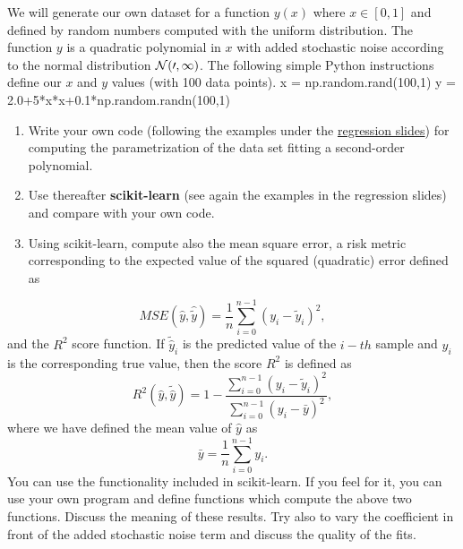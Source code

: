 \documentclass[%
oneside,                 %
final,                   %
10pt]{article}
\newenvironment{doconceexercise}{}{}
\newcounter{doconceexercisecounter}
\begin{document}
\begin{doconceexercise}

                             

We will generate our own dataset for a function $y(x)$ where $x \in [0,1]$ and defined by random numbers computed with the uniform distribution. The function $y$ is a quadratic polynomial in $x$ with added stochastic noise according to the normal distribution $\cal {N}(0,1)$.
The following simple Python instructions define our $x$ and $y$ values (with 100 data points).
\bpycod
x = np.random.rand(100,1)
y = 2.0+5*x*x+0.1*np.random.randn(100,1)
\epycod

\begin{enumerate}
\item Write your own code (following the examples under the \href{{https://compphysics.github.io/MachineLearningECT/doc/pub/Day1/html/Day1-bs.html}}{regression slides}) for computing the parametrization of the data set fitting a second-order polynomial. 

\item Use thereafter \textbf{scikit-learn} (see again the examples in the regression slides) and compare with your own code.   

\item Using scikit-learn, compute also the mean square error, a risk metric corresponding to the expected value of the squared (quadratic) error defined as
\end{enumerate}

\noindent
\[ MSE(\hat{y},\hat{\tilde{y}}) = \frac{1}{n}
\sum_{i=0}^{n-1}(y_i-\tilde{y}_i)^2, 
\] 
and the $R^2$ score function.
If $\tilde{\hat{y}}_i$ is the predicted value of the $i-th$ sample and $y_i$ is the corresponding true value, then the score $R^2$ is defined as
\[
R^2(\hat{y}, \tilde{\hat{y}}) = 1 - \frac{\sum_{i=0}^{n - 1} (y_i - \tilde{y}_i)^2}{\sum_{i=0}^{n - 1} (y_i - \bar{y})^2},
\]
where we have defined the mean value  of $\hat{y}$ as
\[
\bar{y} =  \frac{1}{n} \sum_{i=0}^{n - 1} y_i.
\]
You can use the functionality included in scikit-learn. If you feel for it, you can use your own program and define functions which compute the above two functions. 
Discuss the meaning of these results. Try also to vary the coefficient in front of the added stochastic noise term and discuss the quality of the fits.



\end{doconceexercise}
\end{document}
